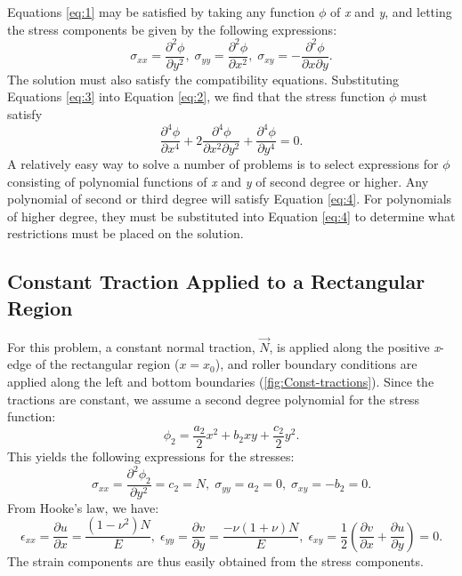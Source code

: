 Equations \vref{eq:1} may be satisfied by taking any function $\phi$
of \textit{x} and \textit{y}, and letting the stress components be
given by the following expressions:
\begin{equation}
\sigma_{xx}=\frac{\partial^{2}\phi}{\partial y^{2}},\;\sigma_{yy}=\frac{\partial^{2}\phi}{\partial x^{2}},\;\sigma_{xy}=-\frac{\partial^{2}\phi}{\partial x\partial y}.\label{eq:3}
\end{equation}
The solution must also satisfy the compatibility equations. Substituting
Equations \vref{eq:3} into Equation \vref{eq:2}, we find that the
stress function $\phi$ must satisfy
\begin{equation}
\frac{\partial^{4}\phi}{\partial x^{4}}+2\frac{\partial^{4}\phi}{\partial x^{2}\partial y^{2}}+\frac{\partial^{4}\phi}{\partial y^{4}}=0.\label{eq:4}
\end{equation}
A relatively easy way to solve a number of problems is to select expressions
for $\phi$ consisting of polynomial functions of \textit{x} and \textit{y}
of second degree or higher. Any polynomial of second or third degree
will satisfy Equation \vref{eq:4}. For polynomials of higher degree,
they must be substituted into Equation \vref{eq:4} to determine what
restrictions must be placed on the solution.


\subsection{\label{sub:Analytical-Constant-Traction}Constant Traction Applied
to a Rectangular Region}

For this problem, a constant normal traction, $\overrightarrow{N}$,
is applied along the positive \textit{x}-edge of the rectangular region
($x=x_{0}$), and roller boundary conditions are applied along the
left and bottom boundaries (\vref{fig:Const-tractions}). Since the
tractions are constant, we assume a second degree polynomial for the
stress function:
\begin{equation}
\phi_{2}=\frac{a_{2}}{2}x^{2}+b_{2}xy+\frac{c_{2}}{2}y^{2}.\label{eq:5}
\end{equation}
This yields the following expressions for the stresses:
\begin{equation}
\sigma_{xx}=\frac{\partial^{2}\phi_{2}}{\partial y^{2}}=c_{2}=N,\;\sigma_{yy}=a_{2}=0,\;\sigma_{xy}=-b_{2}=0.\label{eq:6}
\end{equation}
From Hooke's law, we have:
\begin{equation}
\epsilon_{xx}=\frac{\partial u}{\partial x}=\frac{\left(1-\nu^{2}\right)N}{E},\;\epsilon_{yy}=\frac{\partial v}{\partial y}=\frac{-\nu\left(1+\nu\right)N}{E},\;\epsilon_{xy}=\frac{1}{2}\left(\frac{\partial v}{\partial x}+\frac{\partial u}{\partial y}\right)=0.\label{eq:7}
\end{equation}
The strain components are thus easily obtained from the stress components.

